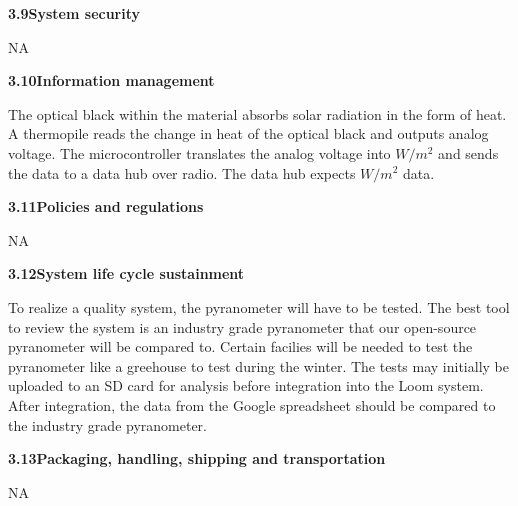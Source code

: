 \documentclass[10pt,draftclsnofoot,onecolumn,letterpaper]{article}
\begin{document}
{\fontsize{10pt}{12.0pt} \textbf{3.9\quad System security}\\\selectfont 
\par}\par
{\fontsize{10pt}{12.0pt} NA\\\selectfont 
\par}\par

{\fontsize{10pt}{12.0pt} \textbf{3.10\quad Information management}\\\selectfont 
\par}\par
{\fontsize{10pt}{12.0pt} The optical black within the material absorbs solar radiation in the form of heat. A thermopile reads the change in heat of the optical black and outputs analog voltage. The microcontroller translates the analog voltage into $W/m^2$ and sends the data to a data hub over radio. The data hub expects $W/m^2$ data.\\\selectfont 
\par}\par

{\fontsize{10pt}{12.0pt} \textbf{3.11\quad Policies and regulations}\\\selectfont 
\par}\par
{\fontsize{10pt}{12.0pt} NA\\\selectfont 
\par}\par

{\fontsize{10pt}{12.0pt} \textbf{3.12\quad System life cycle sustainment}\\\selectfont 
\par}\par
{\fontsize{10pt}{12.0pt} To realize a quality system, the pyranometer will have to be tested. The best tool to review the system is an industry grade pyranometer that our open-source pyranometer will be compared to. Certain facilies will be needed to test the pyranometer like a greehouse to test during the winter. The tests may initially be uploaded to an SD card for analysis before integration into the Loom system. After integration, the data from the Google spreadsheet should be compared to the industry grade pyranometer. \\\selectfont 
\par}\par

{\fontsize{10pt}{12.0pt} \textbf{3.13\quad Packaging, handling, shipping and transportation}\\\selectfont 
\par}\par
{\fontsize{10pt}{12.0pt} NA\\\selectfont 
\par}\par
\end{document}
